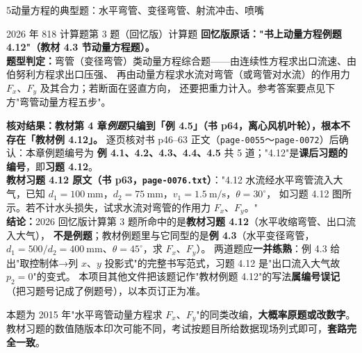 \begin{kaodian}{5}{动量方程的典型题：水平弯管、变径弯管、射流冲击、喷嘴}
\begin{zhenti}{2026 年 818 计算题第 3 题（回忆版）}{计算题}
\textbf{回忆版原话："书上动量方程例题 4.12"（教材 4.3 节动量方程题）。}\\
\textbf{题型判定：}弯管（变径弯管）类动量方程综合题——由连续性方程求出口流速、由伯努利方程求出口压强、
再由动量方程求水流对弯管（或弯管对水流）的作用力 $F_x$、$F_y$ 及其合力；若断面在竖直方向，
还要把重力计入。参考答案要点见下方"弯管动量方程五步"。
\end{zhenti}
\begin{tishi}
\textbf{核对结果：教材第 4 章\emph{例题}只编到「例 4.5」（书 p64，离心风机叶轮），根本不存在「教材例 4.12」。}
逐页核对书 p46--63 正文（\texttt{page-0055}～\texttt{page-0072}）后确认：本章例题编号为
\textbf{例 4.1、4.2、4.3、4.4、4.5} 共 5 道；"4.12"是\textbf{课后习题的编号}，即\textbf{习题 4.12}。\\
\textbf{教材习题 4.12 原文（书 p63，\texttt{page-0076.txt}）}："4.12 水流经水平弯管流入大气，已知 $d_1=100\ \mathrm{mm}$，$d_2=75\ \mathrm{mm}$，$v_1=1.5\ \mathrm{m/s}$，$\theta=30^{\circ}$，
如习题 4.12 图所示。若不计水头损失，试求水流对弯管的作用力 $F_x$、$F_y$。"\\
\textbf{结论：}2026 回忆版计算第 3 题所命中的是\textbf{教材习题 4.12}（水平收缩弯管、出口流入大气），
\textbf{不是例题}；教材例题里与它同型的是\textbf{例 4.3}（水平变径弯管，$d_1=500/d_2=400\ \mathrm{mm}$、$\theta=45^{\circ}$，求 $F_x$、$F_y$）。
两道题应\textbf{一并练熟}：例 4.3 给出"取控制体→列 $x$、$y$ 投影式"的完整书写范式，习题 4.12 是"出口流入大气故 $p_2=0$"的变式。
本项目其他文件把该题记作"教材例题 4.12"的写法\textbf{属编号误记}（把习题号记成了例题号），以本页订正为准。
\end{tishi}
\noindent 本题为 2015 年"水平弯管动量方程求 $F_x$、$F_y$"的同类改编，\textbf{大概率原题或改数字}。
教材习题的数值随版本印次可能不同，考试按题目所给数据现场列式即可，\textbf{套路完全一致}。


\end{kaodian}
